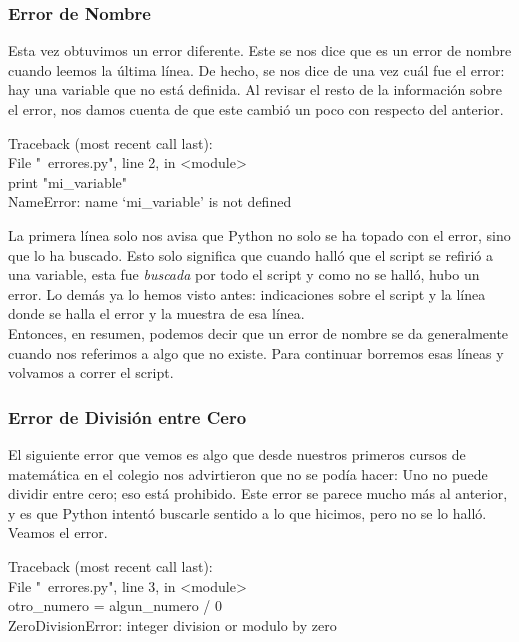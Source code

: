 \documentclass[10pt,letterpaper]{article}
\newenvironment{Code}
{
\begin{lrbox}{\selvestebox}%
\begin{minipage}{\dimexpr\columnwidth-2\fboxsep\relax}
\fontfamily{\ttdefault}\selectfont
}
{\end{minipage}\end{lrbox}%
\begin{center}
\colorbox{light-gray}{\usebox{\selvestebox}}
\end{center}
}
\begin{document}
\subsubsection{Error de Nombre}
Esta vez obtuvimos un error diferente. Este se nos dice que es un error de nombre cuando leemos la \'ultima l\'inea. De hecho, se nos dice de una vez cu\'al fue el error: hay una variable que no est\'a definida. Al revisar el resto de la informaci\'on sobre el error, nos damos cuenta de que este cambi\'o un poco con respecto del anterior.

\begin{Code}
{\color{red}Traceback (most recent call last):\\
\hspace*{4mm} File "\ \hspace{-2mm}errores.py", line 2, in <module>\\
\hspace*{8mm} print "mi\_variable"\\
NameError: name `mi\_variable' is not defined}
\end{Code}

La primera l\'inea solo nos avisa que Python no solo se ha topado con el error, sino que lo ha buscado. Esto solo significa que cuando hall\'o que el script se refiri\'o a una variable, esta fue \emph{buscada} por todo el script y como no se hall\'o, hubo un error. Lo dem\'as ya lo hemos visto antes: indicaciones sobre el script y la l\'inea donde se halla el error y la muestra de esa l\'inea.\\

Entonces, en resumen, podemos decir que un error de nombre se da generalmente cuando nos referimos a algo que no existe. Para continuar borremos esas l\'ineas y volvamos a correr el script.

\subsubsection{Error de Divisi\'on entre Cero}
El siguiente error que vemos es algo que desde nuestros primeros cursos de matem\'atica en el colegio nos advirtieron que no se pod\'ia hacer: Uno no puede dividir entre cero; eso est\'a prohibido. Este error se parece mucho m\'as al anterior, y es que Python intent\'o buscarle sentido a lo que hicimos, pero no se lo hall\'o. Veamos el error.

\begin{Code}
{\color{red}Traceback (most recent call last):\\
\hspace*{4mm} File "\ \hspace{-2mm}errores.py", line 3, in <module>\\
\hspace*{8mm} otro\_numero = algun\_numero / 0\\
ZeroDivisionError: integer division or modulo by zero}
\end{Code}
\end{document}
